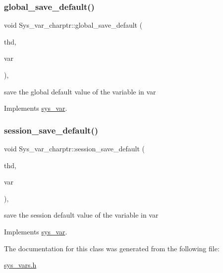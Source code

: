 \subsubsection{\texorpdfstring{global\+\_\+save\+\_\+default()}{global\_save\_default()}}
{\footnotesize\ttfamily void Sys\+\_\+var\+\_\+charptr\+::global\+\_\+save\+\_\+default (\begin{DoxyParamCaption}\item[{T\+HD $\ast$}]{thd,  }\item[{\mbox{\hyperlink{classset__var}{set\+\_\+var}} $\ast$}]{var }\end{DoxyParamCaption})\hspace{0.3cm}{\ttfamily [inline]}, {\ttfamily [virtual]}}

save the global default value of the variable in var 

Implements \mbox{\hyperlink{classsys__var}{sys\+\_\+var}}.

\mbox{\label{classSys__var__charptr_a37d10016ddc7bbe7443be35afd3bb823}} 
\subsubsection{\texorpdfstring{session\+\_\+save\+\_\+default()}{session\_save\_default()}}
{\footnotesize\ttfamily void Sys\+\_\+var\+\_\+charptr\+::session\+\_\+save\+\_\+default (\begin{DoxyParamCaption}\item[{T\+HD $\ast$}]{thd,  }\item[{\mbox{\hyperlink{classset__var}{set\+\_\+var}} $\ast$}]{var }\end{DoxyParamCaption})\hspace{0.3cm}{\ttfamily [inline]}, {\ttfamily [virtual]}}

save the session default value of the variable in var 

Implements \mbox{\hyperlink{classsys__var}{sys\+\_\+var}}.



The documentation for this class was generated from the following file\+:\begin{DoxyCompactItemize}
\item 
\mbox{\hyperlink{sys__vars_8h}{sys\+\_\+vars.\+h}}\end{DoxyCompactItemize}
